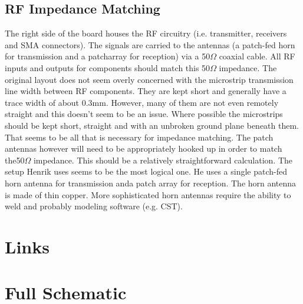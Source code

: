 \documentclass{default}
\newcounter{includepdfpage}
\begin{document}
\section{RF Impedance Matching}

The right side of the board houses the RF circuitry (i.e. transmitter, receivers and SMA
connectors). The signals are carried to the antennas (a patch-fed horn for transmission and a
patcharray for reception) via a 50$\si{\Omega}$ coaxial cable. All RF inputs and outputs for
components should match this 50$\si{\Omega}$ impedance. The original layout does not seem overly
concerned with the microstrip transmission line width between RF components. They are kept short and
generally have a trace width of about 0.3mm. However, many of them are not even remotely straight
and this doesn't seem to be an issue. Where possible the microstrips should be kept short, straight
and with an unbroken ground plane beneath them. That seems to be all that is necessary for impedance
matching. The patch antennas however will need to be appropriately hooked up in order to match
the50$\si{\Omega}$ impedance. This should be a relatively straightforward calculation. The setup
Henrik uses seems to be the most logical one. He uses a single patch-fed horn antenna for
transmission anda patch array for reception. The horn antenna is made of thin copper. More
sophisticated horn antennas require the ability to weld and probably modeling software (e.g. CST).

\chapter{Links}
\label{cha:links}


\chapter{Full Schematic}
\label{cha:schematic}


\end{document}
